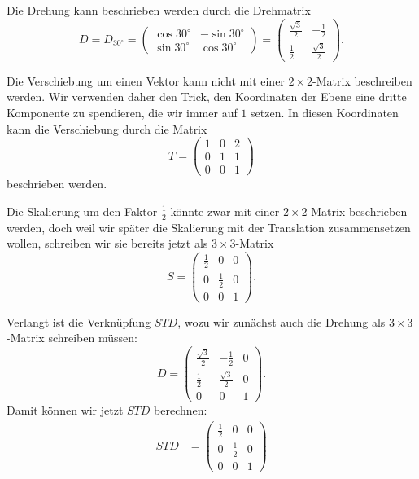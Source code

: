 \begin{loesung}
\begin{teilaufgaben}
\item
Die Drehung kann beschrieben werden durch die Drehmatrix
\[
D=D_{30^\circ}
=
\begin{pmatrix}
\cos 30^\circ & -\sin 30^\circ \\
\sin 30^\circ &  \cos 30^\circ
\end{pmatrix}
=
\begin{pmatrix}
\frac{\sqrt{3}}2 & - \frac12\\
\frac12 & \frac{\sqrt{3}}2
\end{pmatrix}.
\]
\item
Die Verschiebung um einen Vektor kann nicht mit einer $2\times 2$-Matrix
beschreiben werden. Wir verwenden daher den Trick, den Koordinaten der
Ebene eine dritte Komponente zu spendieren, die wir immer auf $1$ setzen.
In diesen Koordinaten kann die Verschiebung durch die Matrix
\[
T=
\begin{pmatrix}
1&0&2\\
0&1&1\\
0&0&1
\end{pmatrix}
\]
beschrieben werden.
\item
Die Skalierung um den Faktor $\frac12$ könnte zwar mit einer $2\times 2$-Matrix
beschrieben werden, doch weil wir später die Skalierung mit der Translation
zusammensetzen wollen, schreiben wir sie bereits jetzt als $3\times 3$-Matrix
\[
S
=
\begin{pmatrix}
\frac12 &     0   & 0 \\
    0   & \frac12 & 0 \\
    0   &     0   & 1 
\end{pmatrix}
.
\]
\item
Verlangt ist die Verknüpfung $STD$, wozu wir zunächst auch die Drehung als
$3\times 3$-Matrix schreiben müssen:
\[
D =
\begin{pmatrix}
\frac{\sqrt{3}}2 & - \frac12        & 0 \\
\frac12          & \frac{\sqrt{3}}2 & 0 \\
      0          &        0         & 1
\end{pmatrix}
.
\]
Damit können wir jetzt $STD$ berechnen:
\begin{align*}
STD
&=
\begin{pmatrix}
\frac12 &     0   & 0 \\
    0   & \frac12 & 0 \\
    0   &     0   & 1 
\end{pmatrix}

\end{align*}
\end{teilaufgaben}
\end{loesung}
